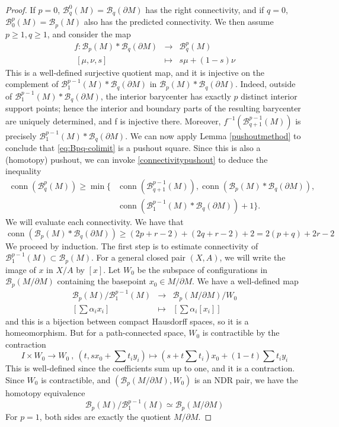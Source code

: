 \documentclass[11pt,a4paper]{article}
\numberwithin{equation}{section}
\theoremstyle{definition}
\theoremstyle{remark}
\newcommand{\pa}{\partial}
\newcommand{\BB}{\mathcal B}
\newcommand{\conn}{\operatorname{conn}}
\begin{document}
\begin{proof}
If $p=0$, $\BB_q^0(M) = \BB_q(\pa M)$ has the right connectivity, and if $q=0$, $\BB_0^p(M)=\BB_p(M)$ also has the predicted connectivity. We then assume $p\geq 1, q\geq 1$, and consider the map 
\begin{eqnarray*}
f: \BB_p(M)*\BB_q(\pa M)&\longrightarrow& \BB_q^p(M)\\
\ [\mu,\nu, s]&\longmapsto& s\mu + (1-s)\nu
\end{eqnarray*}
This is a well-defined surjective quotient map, and it is injective on the complement of $\BB^{p-1}_1(M)*\BB_q(\partial M)$
in $ \BB_p(M)*\BB_q(\partial M)$. Indeed, outside of $\BB^{p-1}_1(M)*\BB_q(\partial M)$, the interior barycenter has exactly $p$ distinct interior support points; hence the interior and boundary parts of the resulting barycenter are uniquely determined, and f is injective there.
Moreover, $f^{-1}(\BB^{p-1}_{q+1}(M))$ is precisely
$\BB^{p-1}_1(M)*\BB_q(\partial M)$. We can now apply
Lemma \ref{pushoutmethod} to conclude that  \eqref{eq:Bpq-colimit} is a pushout square. Since this is also a (homotopy) pushout, we can invoke \eqref{connectivitypushout} to deduce the inequality
\[
\begin{aligned}
\conn(\BB^p_q(M))\geq \min\bigl\{&\conn(\BB^{p-1}_{q+1}(M)),
\conn(\BB_p(M)*\BB_q(\pa M)),\\
&\conn(\BB_1^{p-1}(M)*\BB_q(\pa M))+1\bigr\}.
\end{aligned}
\]
We will evaluate each connectivity. We have that
$$\conn (\BB_p(M)*\BB_q(\partial M))\geq (2p+r-2) + (2q+r-2) + 2= 2(p+q)+ 2r-2$$
We proceed by induction. The first step is to estimate connectivity of $ \BB_1^{p-1}(M)\subset \BB_p(M)$. For a general closed pair $(X,A)$, we will write the image of $x$ in $X/A$ by $[x]$. Let $W_0$ be the subspace of configurations in $\BB_p(M/\pa M)$ containing the basepoint $x_0\in M/\pa M$. We have a well-defined map
\begin{eqnarray*}
\BB_p(M)/\BB_1^{p-1}(M)&\longrightarrow&
\BB_p(M/\partial M)/W_0\\
\left[\sum \alpha_ix_i\right]&\longmapsto&
\left[\sum \alpha_i[x_i]\right]
\end{eqnarray*}
and this is a bijection between compact Hausdorff spaces, so it is a homeomorphism.
But for a path-connected space, $W_0$ is contractible by the contraction 
$$I\times W_0\longrightarrow W_0\ ,\ 
\left(t, sx_0 + \sum t_iy_i\right)\longmapsto \left(s + t\sum t_i\right)x_0 + (1-t)\sum t_iy_i$$
This is well-defined since
the coefficients sum up to one, and it is a contraction.
Since $W_0$ is contractible, and $(\BB_p(M/\pa M),W_0)$ is an NDR pair, we have the homotopy equivalence
\begin{equation}\label{quotient} \BB_p(M)/\BB_1^{p-1}(M)\simeq 
\BB_p(M/\partial M)
\end{equation}
For \(p=1\), both sides are exactly the quotient \(M/\pa M\).


\end{proof}
\end{document}
